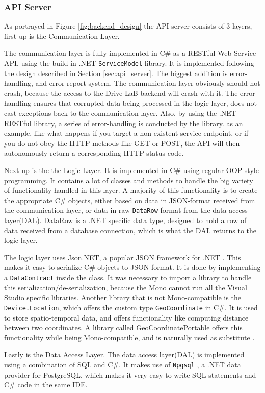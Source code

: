 \subsubsection{API Server}\label{subsec:impl_api_server}
As portrayed in Figure \ref{fig:backend_design} the API server consists of 3 layers, first up is the Communication Layer.

The communication layer is fully implemented in C\# as a RESTful Web Service API, using the build-in .NET \texttt{ServiceModel} library. It is implemented following the design described in Section \ref{sec:api_server}. The biggest addition is error-handling, and error-report-system. The communication layer obviously should not crash, because the access to the Drive-LaB backend will crash with it. The error-handling ensures that corrupted data being processed in the logic layer, does not cast exceptions back to the communication layer. Also, by using the .NET RESTful library, a series of error-handling is conducted by the library. as an example, like what happens if you target a non-existent service endpoint, or if you do not obey the HTTP-methods like GET or POST, the API will then autonomously return a corresponding HTTP status code.

Next up is the the Logic Layer. It is implemented in C\# using regular OOP-style programming. It contains a lot of classes and methods to handle the big variety of functionality handled in this layer. A majority of this functionality is to create the appropriate C\# objects, either based on data in JSON-format received from the communication layer, or data in raw \texttt{DataRow} format from the data access layer(DAL). DataRow is a .NET specific data type, designed to hold a row of data received from a database connection, which is what the DAL returns to the logic layer.  

The logic layer uses Json.NET, a popular JSON framework for .NET \citep{json_dot_net}. This makes it easy to serialize C\# objects to JSON-format. It is done by implementing a \texttt{DataContract} inside the class. It was necessary to import a library to handle this serialization/de-serialization, because the Mono cannot run all the Visual Studio specific libraries. Another library that is not Mono-compatible is the \texttt{Device.Location}, which offers the custom type \texttt{GeoCoordinate} in C\#. It is used to store spatio-temporal data, and offers functionality like computing distance between two coordinates. A library called GeoCoordinatePortable offers this functionality while being Mono-compatible, and is naturally used as substitute \citep{geocoordinateportable}.

Lastly is the Data Access Layer. The data access layer(DAL) is implemented using a combination of SQL and C\#. It makes use of \texttt{Npgsql} \citep{npgsql}, a .NET data provider for PostgreSQL, which makes it very easy to write SQL statements and C\# code in the same IDE. 